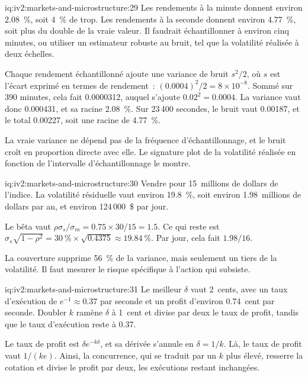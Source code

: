 \begin{solution}{iq:iv2:markets-and-microstructure:29}
Les rendements à la minute donnent environ 2.08~\%, soit 4~\% de trop. Les rendements à la seconde donnent environ 4.77~\%, soit plus du double de la vraie valeur. Il faudrait échantillonner à environ cinq minutes, ou utiliser un estimateur robuste au bruit, tel que la volatilité réalisée à deux échelles.

Chaque rendement échantillonné ajoute une variance de bruit $s^2/2$, où $s$ est l'écart exprimé en termes de rendement~: $(0.0004)^2/2 = 8 \times 10^{-8}$. Sommé sur 390 minutes, cela fait 0.0000312, auquel s'ajoute $0.02^2 = 0.0004$. La variance vaut donc 0.000431, et sa racine 2.08~\%. Sur 23\,400 secondes, le bruit vaut 0.00187, et le total 0.00227, soit une racine de 4.77~\%.

La vraie variance ne dépend pas de la fréquence d'échantillonnage, et le bruit croît en proportion directe avec elle. Le signature plot de la volatilité réalisée en fonction de l'intervalle d'échantillonnage le montre.

\end{solution}

\begin{solution}{iq:iv2:markets-and-microstructure:30}
Vendre pour 15~millions de dollars de l'indice. La volatilité résiduelle vaut environ 19.8~\%, soit environ 1.98~millions de dollars par an, et environ 124\,000~\$ par jour.

Le bêta vaut $\rho\sigma_s/\sigma_m = 0.75 \times 30/15 = 1.5$. Ce qui reste est $\sigma_s\sqrt{1 - \rho^2} = 30~\% \times \sqrt{0.4375} \approx 19.84~\%$. Par jour, cela fait $1.98/16$.

La couverture supprime 56~\% de la variance, mais seulement un tiers de la volatilité. Il faut mesurer le risque spécifique à l'action qui subsiste.

\end{solution}

\begin{solution}{iq:iv2:markets-and-microstructure:31}
Le meilleur $\delta$ vaut 2~cents, avec un taux d'exécution de $e^{-1} \approx 0.37$ par seconde et un profit d'environ 0.74~cent par seconde. Doubler $k$ ramène $\delta$ à 1~cent et divise par deux le taux de profit, tandis que le taux d'exécution reste à 0.37.

Le taux de profit est $\delta e^{-k\delta}$, et sa dérivée s'annule en $\delta = 1/k$. Là, le taux de profit vaut $1/(ke)$. Ainsi, la concurrence, qui se traduit par un $k$ plus élevé, resserre la cotation et divise le profit par deux, les exécutions restant inchangées.

\end{solution}

